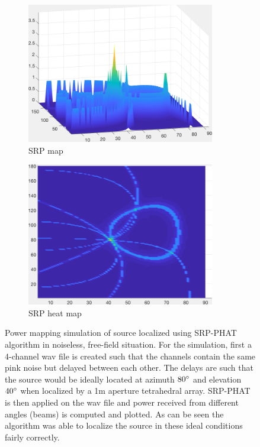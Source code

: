 \begin{figure}[H]
    \centering
    \begin{subfigure}[t]{0.5\textwidth}
    \centering
    \includegraphics[width=0.9\textwidth]{Figures/viewside.png}
    \caption{SRP map}
    \label{fig:viewsidesrp}
\end{subfigure}%
\begin{subfigure}[t]{0.5\textwidth}
    \centering
    \includegraphics[width=0.9\textwidth]{Figures/topview.png}
    \caption{SRP heat map}
    \label{fig:topviewsrp}
\end{subfigure}
\caption{Power mapping simulation of source localized using SRP-PHAT algorithm in noiseless, free-field situation. For the simulation, first a 4-channel wav file is created such that the channels contain the same pink noise but delayed between each other. The delays are such that the source would be ideally located at azimuth $80\degree$ and elevation $40\degree$ when localized by a 1m aperture tetrahedral array. SRP-PHAT is then applied on the wav file and power received from different angles (beams) is computed and plotted. As can be seen the algorithm was able to localize the source in these ideal conditions fairly correctly.}
\end{figure}

